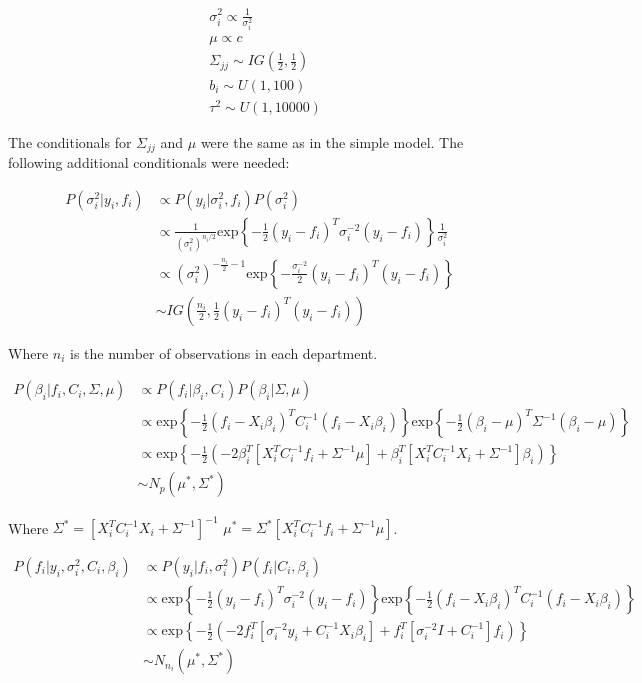 \documentclass[paper=a4, fontsize=11pt]{scrartcl}
\begin{document}
\begin{align*}
    & \sigma^2_i \propto \frac{1}{\sigma^2_i}\\
    & \mu \propto c \\
    & \Sigma_{jj} \sim IG \left(\frac{1}{2}, \frac{1}{2} \right)\\
    & b_i \sim U(1, 100)\\
    & \tau^2 \sim U(1, 10000)
\end{align*}


The conditionals for $\Sigma_{jj}$ and $\mu$ were the same as in the simple model. The following additional conditionals were needed:



\begin{align*}
     P(\sigma^2_i |y_i, f_i ) & \propto P(y_i| \sigma^2_i, f_i)P(\sigma^2_i)\\
     & \propto \frac{1}{(\sigma^2_i)^{n_i/2}} \mbox{exp}\left \{ -\frac{1}{2}(y_i-f_i)^T \sigma^{-2}_i(y_i-f_i)      \right \} \frac{1}{\sigma^2_i}\\
      & \propto (\sigma^2_i)^{-\frac{n_i}{2}-1} \mbox{exp}\left \{ -\frac{\sigma^{-2}_i}{2}(y_i-f_i)^T (y_i-f_i)\right \} \\
      &  \sim IG\left(\frac{n_i}{2}, \frac{1}{2}(y_i-f_i)^T (y_i-f_i)\right)
\end{align*}

Where $n_i$ is the number of observations in each department.

\begin{align*}
     P(\beta_i | f_i, C_i, \Sigma, \mu ) & \propto P(f_i| \beta_i, C_i)P(\beta_i| \Sigma, \mu) \\
     & \propto\mbox{exp}\left \{ -\frac{1}{2}(f_i-X_i\beta_i)^T C^{-1}_i(f_i-X_i\beta_i)      \right \} \mbox{exp}\left \{ -\frac{1}{2}(\beta_i-\mu)^T \Sigma^{-1}(\beta_i-\mu)      \right \} \\
     & \propto \mbox{exp}\left \{ -\frac{1}{2}\left(-2\beta_i^T[X_i^TC_i^{-1}f_i + \Sigma^{-1}\mu] + \beta_i^T[X^T_iC_i^{-1}X_i + 
     \Sigma^{-1}]\beta_i \right)      \right \}\\
    &\sim N_p (\mu^*, \Sigma^*)
\end{align*}


Where  $\Sigma^*=[X^T_iC_i^{-1}X_i + 
     \Sigma^{-1}]^{-1} $ $\mu^*=\Sigma^*[X_i^TC_i^{-1}f_i + \Sigma^{-1}\mu]$.



\begin{align*}
     P(f_i |y_i, \sigma_i^2, C_i, \beta_i) & \propto P(y_i| f_i, \sigma_i^2)P(f_i|C_i, \beta_i) \\
      & \propto  \mbox{exp}\left \{ -\frac{1}{2}(y_i-f_i)^T \sigma^{-2}_i(y_i-f_i)      \right \} \mbox{exp}\left \{ -\frac{1}{2}(f_i-X_i\beta_i)^T C_i^{-1}(f_i-X_i\beta_i)      \right \} \\
       & \propto  \mbox{exp}\left \{ -\frac{1}{2}(-2f_i^T[\sigma_i^{-2}y_i + C_i^{-1}X_i\beta_i]+f_i^T[\sigma_i^{-2}I + C_i^{-1}]f_i) \right \}\\
        &\sim N_{n_i} (\mu^*, \Sigma^*)
\end{align*}
\end{document}

